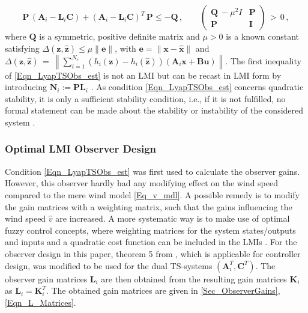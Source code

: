 \documentclass[a4paper]{article}
\newcommand{\xhat}{\widehat{x}}
\newcommand{\zhatB}{\widehat{\B{z}}}
\newcommand{\B}[1]{\mathbf{#1}}
\begin{document}
\begin{equation}
\B{P}\, \left(\B{A}_i - \B{L}_i \B{C}\right) + \left(\B{A}_i - \B{L}_i \B{C}\right)^T \, \B{P} \leq - \B{Q} \, , \qquad
\begin{pmatrix}
\B{Q}\ - \mu^2 I	& \B{P} \\
\B{P}				& \B{I}
\end{pmatrix} \, > \, 0 \, , 	\label{Eqn_LyapTSObs_est}
\end{equation}
\newline where $\B{Q}$ is a symmetric, positive definite matrix and $\mu >0$ is a known constant satisfying $\Delta\left(\B{z},\zhatB\right) \leq \mu \|\B{e}\|$,
with $\B{e} = \|\B{x}-\B{\xhat}\|$ and 
$\Delta\left(\B{z},\zhatB\right) \, = \, \left\|\sum_{i=1}^{N_r} \left(h_i(\B{z}) - h_i(\zhatB)\right) \left(\B{A}_i \B{x} + \B{B} \B{u}\right)\right\|$. The first inequality of \eqref{Eqn_LyapTSObs_est} is not an LMI but can be recast in LMI form by introducing $\B{N}_i := \B{P} \B{L}_i$ \cite{Tanaka:2001}. As condition \eqref{Eqn_LyapTSObs_est} concerns quadratic stability, it is only a sufficient stability condition, i.e., if it is not fulfilled, no formal statement can be made about the stability or instability of the considered system \cite{Lendek:2010}.

\subsubsection*{Optimal LMI Observer Design}

Condition \eqref{Eqn_LyapTSObs_est} was first used to calculate the observer gains. However, this observer hardly had any modifying effect on the wind speed compared to the mere wind model \eqref{Eq_v_mdl}.
A possible remedy is to modify the gain matrices with a weighting matrix, such that the gains influencing the wind speed $\hat{v}$ are increased. A more systematic way is to make use of optimal fuzzy control concepts, where weighting matrices for the system states/outputs and inputs and a quadratic cost function can be included in the LMIs \cite{TanakaTaniguchiWang1:1998}.
\newline For the observer design in this paper, theorem 5 from \cite{TanakaTaniguchiWang1:1998}, which is applicable for controller design, was modified to be used for the dual TS-systems $\left(\B{A}_i^T, \B{C}^T\right)$. The observer gain matrices $\B{L}_i$ are then obtained from the resulting gain matrices $\B{K}_i$ as $\B{L}_i = \B{K}_i^T$. The obtained gain matrices are given in \ref{Sec_ObserverGains}, \eqref{Eqn_L_Matrices}.
\end{document}
